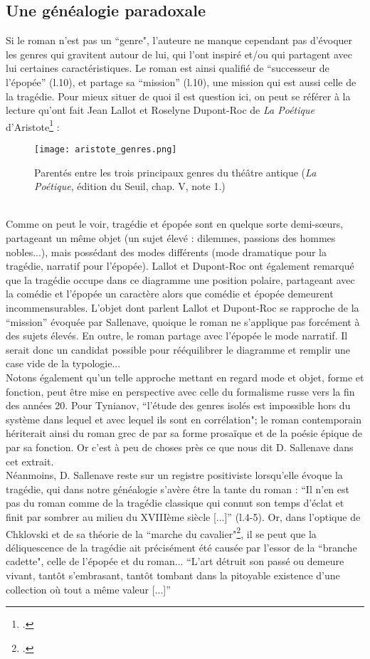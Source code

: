 \documentclass[a4paper,10pt]{article}
\begin{document}
			\subsection{Une généalogie paradoxale}\label{genealogie}
				Si le roman n'est pas un ``genre", l'auteure ne manque cependant pas d'évoquer les genres qui gravitent autour de lui, qui l'ont inspiré et/ou qui partagent avec lui certaines caractéristiques. Le roman est ainsi qualifié de ``successeur de l'épopée'' (l.10), et partage sa ``mission'' (l.10), une mission qui est aussi celle de la tragédie. Pour mieux situer de quoi il est question ici, on peut se référer à la lecture qu'ont fait Jean Lallot et Roselyne Dupont-Roc de \textit{La Poétique} d'Aristote\footcite{Lallot1980} :
				\begin{figure}[h]
					\begin{center}
						\texttt{[image: aristote\_genres.png]}
						\caption{Parentés entre les trois principaux genres du théâtre antique (\textit{La Poétique}, édition du Seuil, chap. V, note 1.)}
					\end{center}
				\end{figure}\\
				Comme on peut le voir, tragédie et épopée sont en quelque sorte demi-sœurs, partageant un même objet (un sujet élevé : dilemmes, passions des hommes nobles...), mais possédant des modes différents (mode dramatique pour la tragédie, narratif pour l'épopée). Lallot et Dupont-Roc ont également remarqué que la tragédie occupe dans ce diagramme une position polaire, partageant avec la comédie et l'épopée un caractère alors que comédie et épopée demeurent incommensurables. L'objet dont parlent Lallot et Dupont-Roc se rapproche de la ``mission'' évoquée par Sallenave, quoique le roman ne s'applique pas forcément à des sujets élevés. En outre, le roman partage avec l'épopée le mode narratif. Il serait donc un candidat possible pour rééquilibrer le diagramme et remplir une case vide de la typologie...\\
				Notons également qu'un telle approche mettant en regard mode et objet, forme et fonction, peut être mise en perspective avec celle du formalisme russe vers la fin des années 20. Pour Tynianov, ``l'étude des genres isolés est impossible hors du système dans lequel et avec lequel ils sont en corrélation"; le roman contemporain hériterait ainsi du roman grec de par sa forme prosaïque et de la poésie épique de par sa fonction. Or c'est à peu de choses près ce que nous dit D. Sallenave dans cet extrait.\\
				Néanmoins, D. Sallenave reste sur un registre positiviste lorsqu'elle évoque la tragédie, qui dans notre généalogie s'avère être la tante du roman : ``Il n'en est pas du roman comme de la tragédie classique qui connut son temps d'éclat et finit par sombrer au milieu du XVIIIème siècle [...]'' (l.4-5). Or, dans l'optique de Chklovski et de sa théorie de la ``marche du cavalier"\footcite{Chklovski1973}, il se peut que la déliquescence de la tragédie ait précisément été causée par l'essor de la ``branche cadette", celle de l'épopée et du roman... ``L'art détruit son passé ou demeure vivant, tantôt s'embrasant, tantôt tombant dans la pitoyable existence d'une collection où tout a même valeur [...]''
	
\end{document}
